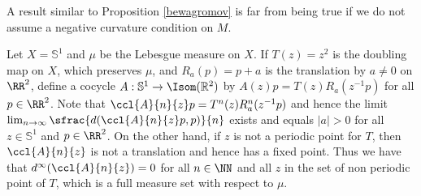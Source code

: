 A result similar to Proposition \ref{bewagromov} is far from being true if we do not assume a negative curvature condition on $M$.
\begin{ej}Let $X=\mathbb{S}^1$ and $\mu$ be the Lebesgue measure on $X$. If $T(z)=z^{2}$ is the doubling map on $X$, which preserves $\mu$, and $R_{a}(p)=p+a$ is the translation by $a\neq 0$ on $\RR^{2}$, define a cocycle $A:\mathbb{S}^1 \rightarrow \Isom(\mathbb{R}^{2})$ by $A(z)p=T(z)R_{a}(z^{-1}p)$ for all $p\in \RR^2$. Note that $\ccl{A}{n}{z}p=T^{n}(z)R^{n}_{a}(z^{-1}p)$ and hence the limit
$\lim_{n \to \infty}{\sfrac{d(\ccl{A}{n}{z}p,p)}{n}}$ exists and equals $|a|>0$ for all $z\in \mathbb{S}^1$ and $p\in \RR^2$. On the other hand, if $z$ is not a periodic point for $T$, then $\ccl{A}{n}{z}$ is not a translation and hence has a fixed point. Thus we have that $d^{\infty}(\ccl{A}{n}{z})=0$ for all $n\in \NN$ and all $z$ in the set of non periodic point of $T$, which is a full measure set with respect to $\mu$.
\end{ej}

\Changelback
